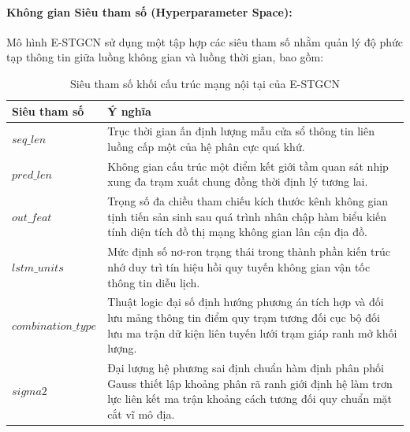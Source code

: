 \paragraph{Không gian Siêu tham số (Hyperparameter Space):}
Mô hình E-STGCN sử dụng một tập hợp các siêu tham số nhằm quản lý độ phức tạp thông tin giữa luồng không gian và luồng thời gian, bao gồm:

\begin{table}[htbp]
\centering
\caption{Siêu tham số khối cấu trúc mạng nội tại của E-STGCN}
\label{tab:estgcn_structure}
\renewcommand{\arraystretch}{1.3}
\begin{tabular}{p{4cm} p{10.3cm}}
\toprule
\textbf{Siêu tham số} & \textbf{Ý nghĩa} \\
\midrule
$seq\_len$ & Trục thời gian ấn định lượng mẫu cửa sổ thông tin liên luồng cấp một của hệ phân cực quá khứ. \\
$pred\_len$ & Không gian cấu trúc một điểm kết giới tầm quan sát nhịp xung đa trạm xuất chung đồng thời định lý tương lai. \\
$out\_feat$ & Trọng số đa chiều tham chiếu kích thước kênh không gian tịnh tiến sản sinh sau quá trình nhân chập hàm biểu kiến tính diện tích đồ thị mạng không gian lân cận địa đồ. \\
$lstm\_units$ & Mức định số nơ-ron trạng thái trong thành phần kiến trúc nhớ duy trì tín hiệu hồi quy tuyến không gian vận tốc thông tin diễu lịch. \\
$combination\_type$ & Thuật logic đại số định hướng phương án tích hợp và đối lưu mảng thông tin điểm quy trạm tương đối cục bộ đối lưu ma trận dữ kiện liên tuyến lưới trạm giáp ranh mở khối lượng. \\
$sigma2$ & Đại lượng hệ phương sai định chuẩn hàm định phân phối Gauss thiết lập khoảng phân rã ranh giới định hệ làm trơn lực liên kết ma trận khoảng cách tương đối quy chuẩn mặt cắt vĩ mô địa. \\
\bottomrule
\end{tabular}
\end{table}

